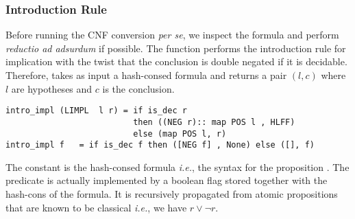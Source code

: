 \documentclass[a4paper,UKenglish,cleveref, autoref, thm-restate]{lipics-v2019}
\begin{document}
\subsubsection{Introduction Rule}
Before running the CNF conversion \emph{per se}, we inspect the
formula and perform \emph{reductio ad adsurdum} if possible. The
function  performs the introduction rule for
implication with the twist that the conclusion is double negated if it
is decidable. Therefore,  takes as input a hash-consed formula and returns a pair
$(l,c)$ where $l$ are hypotheses and $c$ is the conclusion.
\begin{verbatim}
intro_impl (LIMPL  l r) = if is_dec r
                          then ((NEG r):: map POS l , HLFF)
                          else (map POS l, r)
intro_impl f   = if is_dec f then ([NEG f] , None) else ([], f)
\end{verbatim}
The constant  is the hash-consed formula 
\emph{i.e.}, the syntax for the proposition .  The
 predicate is actually implemented by a boolean flag
stored together with the hash-cons of the formula. It is recursively
propagated from atomic propositions that are known to be classical
\emph{i.e.}, we have $r \lor \neg r$.
\end{document}

